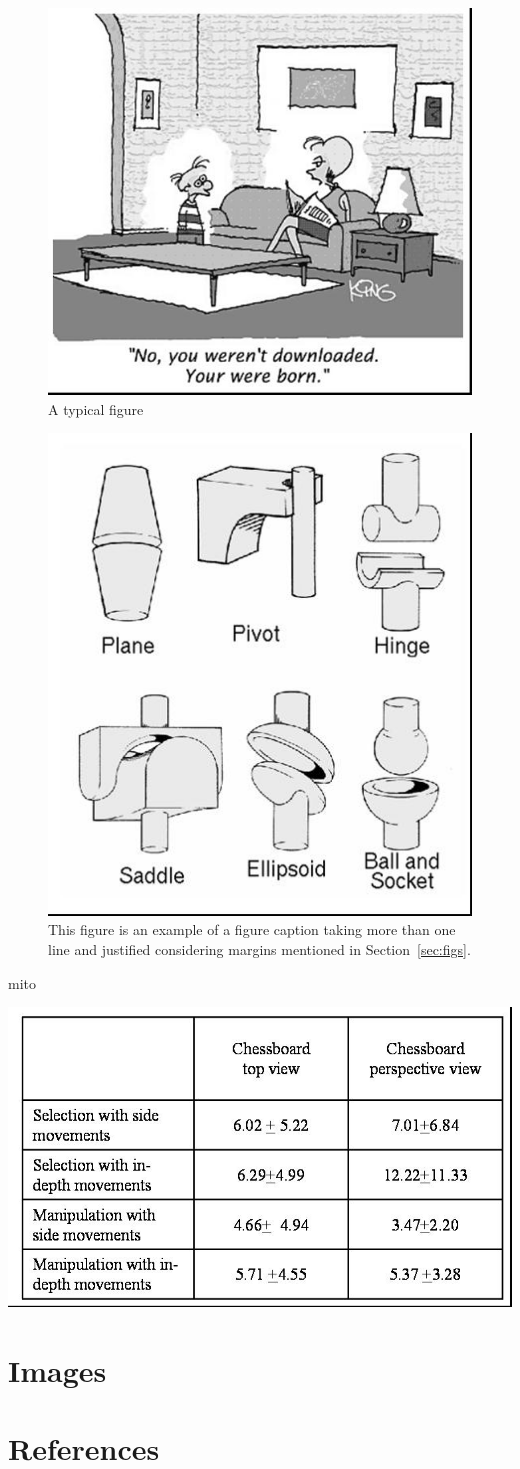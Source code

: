 \documentclass[12pt]{article}
\begin{document}
\begin{figure}[ht]
\centering
\includegraphics[width=.5\textwidth]{fig1.jpg}
\caption{A typical figure}
\label{fig:exampleFig1}
\end{figure}

\begin{figure}[ht]
\centering
\includegraphics[width=.3\textwidth]{fig2.jpg}
\caption{This figure is an example of a figure caption taking more than one
  line and justified considering margins mentioned in Section~\ref{sec:figs}.}
\label{fig:exampleFig2}
\end{figure}

mito~\cite{Chellas1980-CHEMLA-2}
\begin{table}[ht]
\centering
\caption{Variables to be considered on the evaluation of interaction
  techniques}
\label{tab:exTable1}
\includegraphics[width=.7\textwidth]{table.jpg}
\end{table}

\section{Images}


\section{References}




\end{document}
